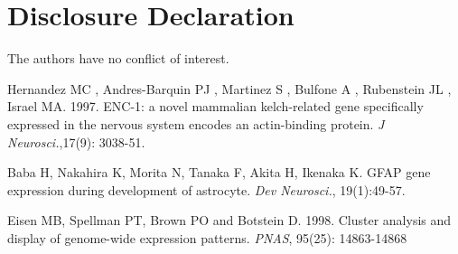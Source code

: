 \documentclass[10pt,letterpaper]{article}
\begin{document}
\nolinenumbers



\section*{Disclosure Declaration}

The authors have no conflict of interest.

\nolinenumbers




\clearpage

\begin{thebibliography}{9}

%
%



Hernandez MC , Andres-Barquin PJ , Martinez S , Bulfone A , Rubenstein JL , Israel MA. 1997.
ENC-1: a novel mammalian kelch-related gene specifically expressed in the nervous system encodes an actin-binding protein.
\textit{J Neurosci.},17(9): 3038-51.

Baba H, Nakahira K, Morita N, Tanaka F, Akita H, Ikenaka K.
GFAP gene expression during development of astrocyte.
\textit{Dev Neurosci.}, 19(1):49-57.

Eisen MB, Spellman PT, Brown PO and Botstein D. 1998.
Cluster analysis and display of genome-wide expression patterns.
\textit{PNAS}, 95(25): 14863-14868


\end{thebibliography}
\end{document}
